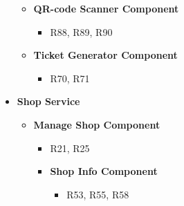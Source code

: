 \begin{itemize}
\begin{itemize}
\begin{itemize}
                \end{itemize}
            \item \textbf{QR-code Scanner  Component} 
                \begin{itemize}
                          \item R88, R89, R90
                \end{itemize}
            \item \textbf{Ticket Generator Component} 
                \begin{itemize}
                            \item R70, R71
                \end{itemize}   
        \end{itemize}
    \item \textbf{Shop Service}
        \begin{itemize}
            \item \textbf{Manage Shop Component}
                \begin{itemize}
                    \item R21, R25
                \end{itemize}
                \begin{itemize}
                    \item \textbf{Shop Info Component}
                        \begin{itemize}
                            \item R53, R55, R58
                        \end{itemize}
                \end{itemize}
        \end{itemize}
\end{itemize}

